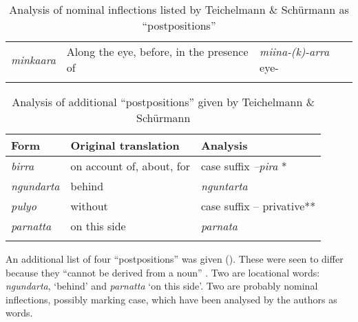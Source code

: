 \begin{table}[b]
\begin{tabularx}{\textwidth}{lp{6cm}Q}
        \textit{minkaara} & Along the eye, before, in the presence of & \textit{miina-(k)-arra} \newline eye-\\
        \lspbottomrule
    \end{tabularx}
    \caption{\label{tab:5:82} Analysis of nominal inflections listed by Teichelmann \& Schürmann as ``postpositions''}
    \label{tab:chap5:nominal}
\end{table}

\begin{table}
	\small
    \begin{tabularx}{\textwidth}{QQQ}
        \lsptoprule
        Form & Original translation &  Analysis \\
        \midrule
        \textit{birra} & on account of, about, for & case suffix \textit{–pira} *\\
        \textit{ngundarta} & behind & \textit{nguntarta}\\
        \textit{pulyo} & without & case suffix – privative**\\
        \textit{parnatta} & on this side & \textit{parnata}\\
        \lspbottomrule
    \end{tabularx}
    \caption{\label{tab:5:83} Analysis of additional ``postpositions'' given by Teichelmann \& Schürmann}
    \label{tab:chap5:postpo}
\end{table}


An additional list of four “postpositions” was given (). These were seen to differ because they “cannot be derived from a noun” \citep[22]{teichelmann_outlines_1840}. Two are locational words: \textit{ngundarta}, `behind' and \textit{parnatta} `on this side'. Two are probably nominal inflections, possibly marking case, which have been analysed by the authors as words.




